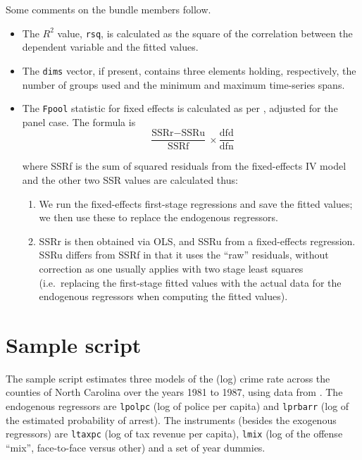 \documentclass{article}
\begin{document}
Some comments on the bundle members follow.

\begin{itemize}

\item The $R^2$ value, \texttt{rsq}, is calculated as the square of the
  correlation between the dependent variable and the fitted values.

\item The \texttt{dims} vector, if present, contains three elements
  holding, respectively, the number of groups used and the minimum and
  maximum time-series spans.

\item The \texttt{Fpool} statistic for fixed effects is calculated as
  per \cite{wooldridge90}, adjusted for the panel case. The formula is
\[
 \frac{\mbox{SSRr} - \mbox{SSRu}}{\mbox{SSRf}} \times 
  \frac{\mbox{dfd}}{\mbox{dfn}}
\]

 where SSRf is the sum of squared residuals from the fixed-effects IV
 model and the other two SSR values are calculated thus:
\begin{enumerate}
\item We run the fixed-effects first-stage regressions and save the
  fitted values; we then use these to replace the endogenous
  regressors.
\item SSRr is then obtained via OLS, and SSRu from a fixed-effects
  regression. SSRu differs from SSRf in that it uses the ``raw''
  residuals, without correction as one usually applies with two stage
  least squares (i.e.\ replacing the first-stage fitted values with
  the actual data for the endogenous regressors when computing the
  fitted values).
\end{enumerate}

\end{itemize}

\section{Sample script}

The sample script estimates three models of the (log) crime rate
across the counties of North Carolina over the years 1981 to 1987,
using data from \cite{cornwell94}. The endogenous regressors are
\texttt{lpolpc} (log of police per capita) and \texttt{lprbarr} (log
of the estimated probability of arrest). The instruments (besides the
exogenous regressors) are \texttt{ltaxpc} (log of tax revenue per
capita), \texttt{lmix} (log of the offense ``mix'', face-to-face
versus other) and a set of year dummies. 
\end{document}
